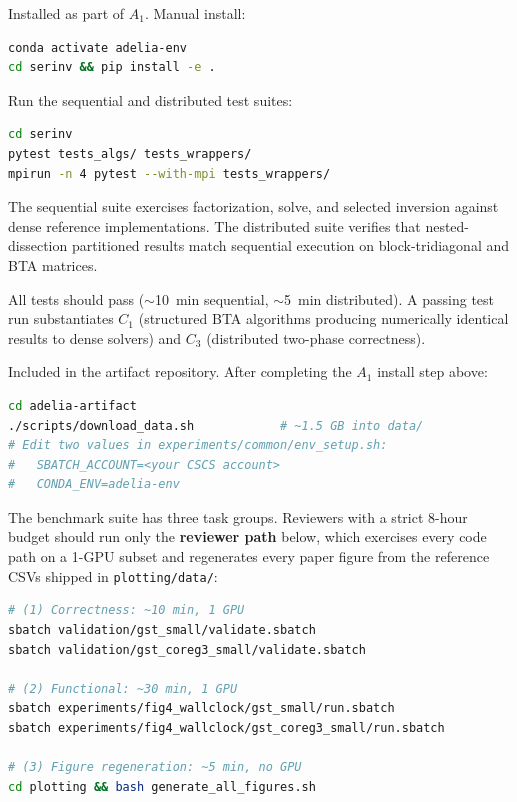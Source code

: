 \documentclass[nonacm,sigconf]{acmart}
\begin{document}

\artin

Installed as part of $A_1$. Manual install:
\begin{lstlisting}[language=bash]
conda activate adelia-env
cd serinv && pip install -e .
\end{lstlisting}

\artcomp

Run the sequential and distributed test suites:
\begin{lstlisting}[language=bash]
cd serinv
pytest tests_algs/ tests_wrappers/
mpirun -n 4 pytest --with-mpi tests_wrappers/
\end{lstlisting}

\noindent
The sequential suite exercises factorization, solve, and selected
inversion against dense reference implementations. The distributed
suite verifies that nested-dissection partitioned results match
sequential execution on block-tridiagonal and BTA matrices.

\artout

All tests should pass ($\sim$10~min sequential, $\sim$5~min
distributed). A passing test run substantiates $C_1$ (structured
BTA algorithms producing numerically identical results to dense
solvers) and $C_3$ (distributed two-phase correctness).



\artin

Included in the artifact repository. After completing the $A_1$
install step above:

\begin{lstlisting}[language=bash]
cd adelia-artifact
./scripts/download_data.sh            # ~1.5 GB into data/
# Edit two values in experiments/common/env_setup.sh:
#   SBATCH_ACCOUNT=<your CSCS account>
#   CONDA_ENV=adelia-env
\end{lstlisting}

\artcomp

The benchmark suite has three task groups. Reviewers with a
strict 8-hour budget should run only the \textbf{reviewer path}
below, which exercises every code path on a 1-GPU subset and
regenerates every paper figure from the reference CSVs shipped
in \texttt{plotting/data/}:

\begin{lstlisting}[language=bash]
# (1) Correctness: ~10 min, 1 GPU
sbatch validation/gst_small/validate.sbatch
sbatch validation/gst_coreg3_small/validate.sbatch

# (2) Functional: ~30 min, 1 GPU
sbatch experiments/fig4_wallclock/gst_small/run.sbatch
sbatch experiments/fig4_wallclock/gst_coreg3_small/run.sbatch

# (3) Figure regeneration: ~5 min, no GPU
cd plotting && bash generate_all_figures.sh
\end{lstlisting}
\end{document}
